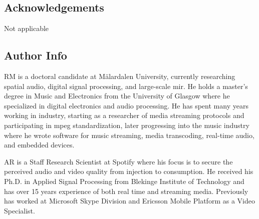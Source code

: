 \documentclass[referee,pdflatex,sn-mathphys-num]{sn-jnl}%
\begin{document}
\subsection*{Acknowledgements}
Not applicable

\subsection*{Author Info}
RM is a doctoral candidate at M{\"a}lardalen University, currently researching spatial audio, digital signal processing, and large-scale \gls{mir}. He holds a master's degree in Music and Electronics from the University of Glasgow where he specialized in digital electronics and audio processing. He has spent many years working in industry, starting as a researcher of media streaming protocols and participating in \gls{mpeg} standardization, later progressing into the music industry where he wrote software for music streaming, media transcoding, real-time audio, and embedded devices.

AR is a Staff Research Scientist at Spotify where his focus is to secure the perceived audio and video quality from injection to consumption. He received his Ph.D. in Applied Signal Processing from Blekinge Institute of Technology and has over 15 years experience of both real time and streaming media. Previously has worked at Microsoft Skype Division and Ericsson Mobile Platform as a Video Specialist.
\end{document}
